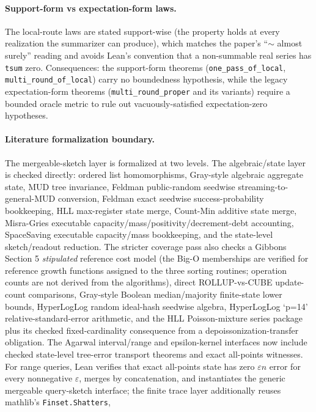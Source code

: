 \paragraph{Support-form vs expectation-form laws.} The local-route laws are
stated support-wise (the property holds at every realization the summarizer
can produce), which matches the paper's ``$\sim$ almost surely'' reading and
avoids Lean's convention that a non-summable real series has \texttt{tsum}
zero. Consequences: the support-form theorems
(\texttt{one\_pass\_of\_local}, \texttt{multi\_round\_of\_local}) carry no
boundedness hypothesis, while the legacy expectation-form theorems
(\texttt{multi\_round\_proper} and its variants) require a bounded oracle
metric to rule out vacuously-satisfied expectation-zero hypotheses.

\paragraph{Literature formalization boundary.} The mergeable-sketch layer is
formalized at two levels. The algebraic/state layer is checked directly:
ordered list homomorphisms, Gray-style algebraic aggregate state, MUD tree
invariance, Feldman public-random seedwise streaming-to-general-MUD conversion,
Feldman exact seedwise success-probability bookkeeping, HLL max-register state
merge, Count-Min additive state merge, Misra-Gries executable
capacity/mass/positivity/decrement-debt accounting, SpaceSaving executable
capacity/mass bookkeeping, and the state-level sketch/readout reduction. The stricter coverage
pass also checks a Gibbons Section 5 \emph{stipulated} reference cost model
(the Big-O memberships are verified for reference growth functions assigned to
the three sorting routines; operation counts are not derived from the
algorithms), direct
ROLLUP-vs-CUBE update-count comparisons, Gray-style Boolean median/majority
finite-state lower bounds, HyperLogLog random ideal-hash seedwise algebra,
HyperLogLog `p=14' relative-standard-error arithmetic, and the HLL
Poisson-mixture series package plus its checked fixed-cardinality consequence
from a depoissonization-transfer obligation.
The Agarwal interval/range and epsilon-kernel interfaces now include checked
state-level tree-error transport theorems and exact all-points witnesses.  For
range queries, Lean verifies that exact all-points state has zero
\(\varepsilon n\) error for every nonnegative \(\varepsilon\), merges by
concatenation, and instantiates the generic mergeable query-sketch interface;
the finite trace layer additionally reuses mathlib's \texttt{Finset.Shatters},
